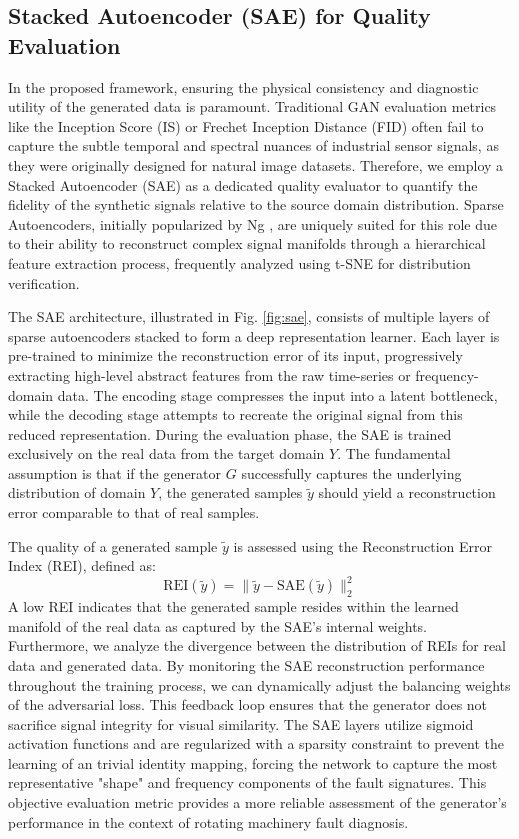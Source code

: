 \subsection{Stacked Autoencoder (SAE) for Quality Evaluation}
\label{sec:sae}

In the proposed framework, ensuring the physical consistency and diagnostic utility of the generated data is paramount. Traditional GAN evaluation metrics like the Inception Score (IS) or Frechet Inception Distance (FID) often fail to capture the subtle temporal and spectral nuances of industrial sensor signals, as they were originally designed for natural image datasets. Therefore, we employ a Stacked Autoencoder (SAE) as a dedicated quality evaluator to quantify the fidelity of the synthetic signals relative to the source domain distribution. Sparse Autoencoders, initially popularized by Ng \cite{Ng2011}, are uniquely suited for this role due to their ability to reconstruct complex signal manifolds through a hierarchical feature extraction process, frequently analyzed using t-SNE \cite{Maaten2008} for distribution verification.

The SAE architecture, illustrated in Fig. \ref{fig:sae}, consists of multiple layers of sparse autoencoders stacked to form a deep representation learner. Each layer is pre-trained to minimize the reconstruction error of its input, progressively extracting high-level abstract features from the raw time-series or frequency-domain data. The encoding stage compresses the input into a latent bottleneck, while the decoding stage attempts to recreate the original signal from this reduced representation. During the evaluation phase, the SAE is trained exclusively on the real data from the target domain $Y$. The fundamental assumption is that if the generator $G$ successfully captures the underlying distribution of domain $Y$, the generated samples $\tilde{y}$ should yield a reconstruction error comparable to that of real samples.

The quality of a generated sample $\tilde{y}$ is assessed using the Reconstruction Error Index (REI), defined as:
\begin{equation}
\text{REI}(\tilde{y}) = \| \tilde{y} - \text{SAE}(\tilde{y}) \|_2^2
\label{eq:rei}
\tag{9}
\end{equation}
A low REI indicates that the generated sample resides within the learned manifold of the real data as captured by the SAE's internal weights. Furthermore, we analyze the divergence between the distribution of REIs for real data and generated data. By monitoring the SAE reconstruction performance throughout the training process, we can dynamically adjust the balancing weights of the adversarial loss. This feedback loop ensures that the generator does not sacrifice signal integrity for visual similarity. The SAE layers utilize sigmoid activation functions and are regularized with a sparsity constraint to prevent the learning of an trivial identity mapping, forcing the network to capture the most representative "shape" and frequency components of the fault signatures. This objective evaluation metric provides a more reliable assessment of the generator's performance in the context of rotating machinery fault diagnosis.

